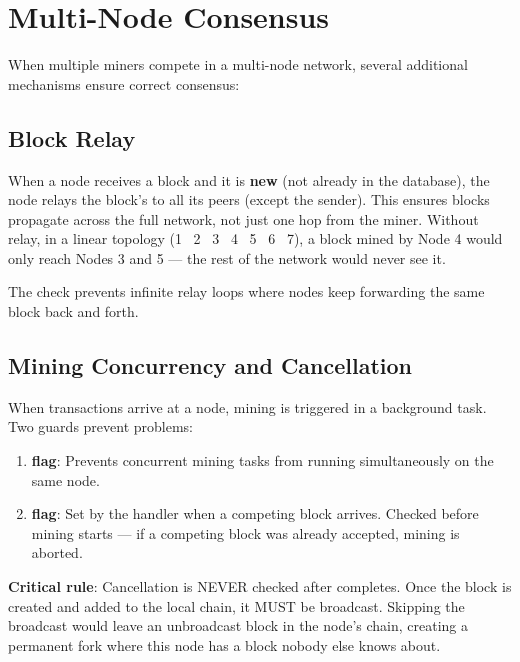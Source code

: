 \section{Multi-Node Consensus}
\label{sec:ch09-7-multinode}

When multiple miners compete in a multi-node network, several additional mechanisms ensure correct consensus:

\subsection{Block Relay}
\label{sec:ch09-7-relay}

When a node receives a block and it is \textbf{new} (not already in the database), the node relays the block's  to all its peers (except the sender). This ensures blocks propagate across the full network, not just one hop from the miner. Without relay, in a linear topology (1 \textrightarrow\ 2 \textrightarrow\ 3 \textrightarrow\ 4 \textrightarrow\ 5 \textrightarrow\ 6 \textrightarrow\ 7), a block mined by Node 4 would only reach Nodes 3 and 5 --- the rest of the network would never see it.

The  check prevents infinite relay loops where nodes keep forwarding the same block back and forth.

\subsection{Mining Concurrency and Cancellation}
\label{sec:ch09-7-mining}

When transactions arrive at a node, mining is triggered in a background task. Two guards prevent problems:

\begin{enumerate}
  \item \textbf{ flag}: Prevents concurrent mining tasks from running simultaneously on the same node.
  \item \textbf{ flag}: Set by the  handler when a competing block arrives. Checked before mining starts --- if a competing block was already accepted, mining is aborted.
\end{enumerate}

\textbf{Critical rule}: Cancellation is NEVER checked after  completes. Once the block is created and added to the local chain, it MUST be broadcast. Skipping the broadcast would leave an unbroadcast block in the node's chain, creating a permanent fork where this node has a block nobody else knows about.

